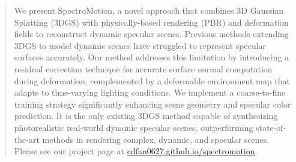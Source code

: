 \begin{abstract}

We present SpectroMotion, a novel approach that combines 3D Gaussian Splatting (3DGS) with physically-based rendering (PBR) and deformation fields to reconstruct dynamic specular scenes. Previous methods extending 3DGS to model dynamic scenes have struggled to represent specular surfaces accurately. Our method addresses this limitation by introducing a residual correction technique for accurate surface normal computation during deformation, complemented by a deformable environment map that adapts to time-varying lighting conditions. We implement a coarse-to-fine training strategy significantly enhancing scene geometry and specular color prediction. It is the only existing 3DGS method capable of synthesizing photorealistic real-world dynamic specular scenes, outperforming state-of-the-art methods in rendering complex, dynamic, and specular scenes.
Please see our project page at \href{https://cdfan0627.github.io/spectromotion/}{cdfan0627.github.io/spectromotion}.
\end{abstract}
